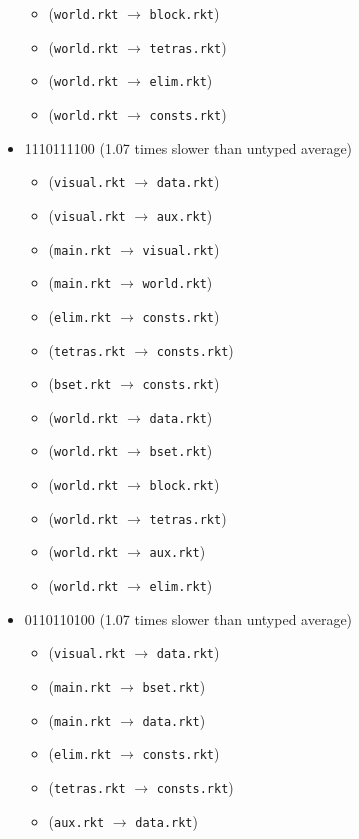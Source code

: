 \documentclass{article}
\newcommand{\mono}[1]{\texttt{#1}}
\begin{document}
\begin{itemize}
\begin{itemize}
  \item (\mono{world.rkt} $\rightarrow$ \mono{block.rkt})
  \item (\mono{world.rkt} $\rightarrow$ \mono{tetras.rkt})
  \item (\mono{world.rkt} $\rightarrow$ \mono{elim.rkt})
  \item (\mono{world.rkt} $\rightarrow$ \mono{consts.rkt})
  \end{itemize}
\item 1110111100 (1.07 times slower than untyped average)
  \begin{itemize}
  \item (\mono{visual.rkt} $\rightarrow$ \mono{data.rkt})
  \item (\mono{visual.rkt} $\rightarrow$ \mono{aux.rkt})
  \item (\mono{main.rkt} $\rightarrow$ \mono{visual.rkt})
  \item (\mono{main.rkt} $\rightarrow$ \mono{world.rkt})
  \item (\mono{elim.rkt} $\rightarrow$ \mono{consts.rkt})
  \item (\mono{tetras.rkt} $\rightarrow$ \mono{consts.rkt})
  \item (\mono{bset.rkt} $\rightarrow$ \mono{consts.rkt})
  \item (\mono{world.rkt} $\rightarrow$ \mono{data.rkt})
  \item (\mono{world.rkt} $\rightarrow$ \mono{bset.rkt})
  \item (\mono{world.rkt} $\rightarrow$ \mono{block.rkt})
  \item (\mono{world.rkt} $\rightarrow$ \mono{tetras.rkt})
  \item (\mono{world.rkt} $\rightarrow$ \mono{aux.rkt})
  \item (\mono{world.rkt} $\rightarrow$ \mono{elim.rkt})
  \end{itemize}
\item 0110110100 (1.07 times slower than untyped average)
  \begin{itemize}
  \item (\mono{visual.rkt} $\rightarrow$ \mono{data.rkt})
  \item (\mono{main.rkt} $\rightarrow$ \mono{bset.rkt})
  \item (\mono{main.rkt} $\rightarrow$ \mono{data.rkt})
  \item (\mono{elim.rkt} $\rightarrow$ \mono{consts.rkt})
  \item (\mono{tetras.rkt} $\rightarrow$ \mono{consts.rkt})
  \item (\mono{aux.rkt} $\rightarrow$ \mono{data.rkt})

\end{itemize}
\end{itemize}
\end{document}
